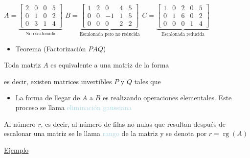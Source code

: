 \documentclass[12pt]{article}
\DeclareMathOperator{\rg}{rg}
\begin{document}
$A=\underbrace{\begin{bmatrix}
2 & 0 & 0 & 5 \\ 
0 & 1 & 0 & 2 \\ 
0 & 3 & 1 & 4
\end{bmatrix} }_{\text{No escalonada}}$\hspace{0.5cm}
$B=\underbrace{\begin{bmatrix}
1 & 2 & 0 & 4 & 5 \\ 
0 & 0 & -1 & 1 & 5 \\ 
0 & 0 & 0 & 2 & 2
\end{bmatrix} }_{\text{Escalonada pero no
reducida}}$\hspace{0.5cm} $C=\underbrace{\begin{bmatrix}
1 & 0 & 2 & 0 & 5 \\ 
0 & 1 & 6 & 0 & 2 \\ 
0 & 0 & 0 & 1 & 4
\end{bmatrix}}_{\text{Escalonada reducida}}$
\begin{itemize}[label=\color{red}\textbullet, leftmargin=*]
    \item \color{lightblue} Teorema (Factorización $PAQ$)
\end{itemize}
Toda matriz $A$ es equivalente a una matriz de la forma 
\begin{center}
\end{center}
es decir, existen matrices invertibles $P$ y $Q$ tales que 


\begin{itemize}[label=$\longrightarrow$]
\item La forma de llegar de $A$ a $B$ es realizando operaciones
elementales. Este proceso se llama
\textcolor{lightblue}{eliminación gaussiana}
\end{itemize}

Al número $r$, es decir, al número de filas no nulas que
resultan después de escalonar una matriz se le llama
\textcolor{lightblue}{rango} de la matriz y se denota por
$r=\rg(A)$

\underline{Ejemplo}
\end{document}
